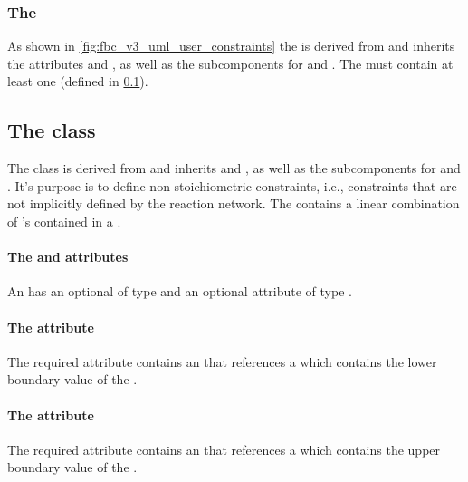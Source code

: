 \subsubsection{The \FBC {}}
\label{listofuserconstraints-class}

As shown in \ref{fig:fbc_v3_uml_user_constraints} the \ListOfUserConstraints is derived from \SBase
and inherits the attributes  and , as well as
the subcomponents for \Annotation and \Notes. The
\ListOfUserConstraints must contain at least one \UserConstraint (defined in
\ref{userconstraint-class}).

\subsection{The \FBC {} class}
\label{userconstraint-class}

The \FBC \UserConstraint class is derived from \SBML \SBase and inherits
 and , as well as the subcomponents for
\Annotation and \Notes. It's purpose is to define non-stoichiometric constraints, i.e., constraints that are not implicitly defined by the reaction network. The \UserConstraint contains a linear combination of \UserConstraintComponent's contained in a \ListOfUserConstraintComponents.

\paragraph{The  and  attributes}
An \UserConstraint has an optional  of type
 and an optional attribute  of type .

\paragraph{The  attribute}
The required  attribute contains an  that references a \Parameter which contains the lower boundary value of the \UserConstraint.

\paragraph{The  attribute}
The required  attribute contains an  that references a \Parameter which contains the upper boundary value of the \UserConstraint.

